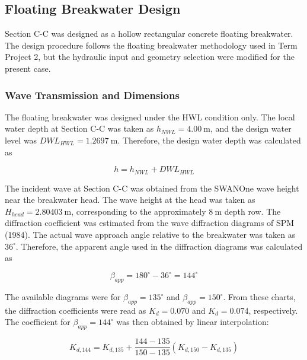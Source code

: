 \documentclass[a4paper, 11pt]{article}
\begin{document}
\subsection{Floating Breakwater Design}

\hspace*{0.5cm} Section C-C was designed as a hollow rectangular concrete floating breakwater. The design procedure follows the floating breakwater methodology used in Term Project 2, but the hydraulic input and geometry selection were modified for the present case.

\subsubsection{Wave Transmission and Dimensions}

\hspace*{0.5cm} The floating breakwater was designed under the HWL condition only. The local water depth at Section C-C was taken as \(h_{NWL}=4.00~\mathrm{m}\), and the design water level was \(DWL_{HWL}=1.2697~\mathrm{m}\). Therefore, the design water depth was calculated as

\begin{equation}
    h=h_{NWL}+DWL_{HWL}
\end{equation}

The incident wave at Section C-C was obtained from the SWANOne wave height near the breakwater head. The wave height at the head was taken as \(H_{head}=2.80403~\mathrm{m}\), corresponding to the approximately \(8~\mathrm{m}\) depth row. The diffraction coefficient was estimated from the wave diffraction diagrams of SPM (1984). The actual wave approach angle relative to the breakwater was taken as \(36^\circ\). Therefore, the apparent angle used in the diffraction diagrams was calculated as

\begin{equation}
    \beta_{app}=180^\circ-36^\circ=144^\circ
\end{equation}

The available diagrams were for \(\beta_{app}=135^\circ\) and \(\beta_{app}=150^\circ\). From these charts, the diffraction coefficients were read as \(K_d=0.070\) and \(K_d=0.074\), respectively. The coefficient for \(\beta_{app}=144^\circ\) was then obtained by linear interpolation:

\begin{equation}
    K_{d,144}
    =
    K_{d,135}
    +
    \frac{144-135}{150-135}
    \left(K_{d,150}-K_{d,135}\right)
\end{equation}
\end{document}
